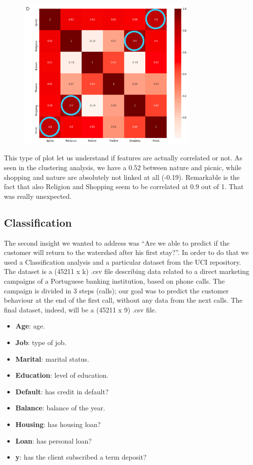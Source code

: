 \begin{figure}[H]
\centering
\includegraphics[width=0.8\textwidth]{Img/correlation_review.png}
\end{figure}

This type of plot let us understand if features are actually correlated or not. As seen in the clustering analysis, we have a 0.52 between nature and picnic, while shopping and nature are absolutely not linked at all (-0.19).
Remarkable is the fact that also Religion and Shopping seem to be correlated at 0.9 out of 1. That was really unexpected.

\newpage
\subsection{Classification}
The second insight we wanted to address was “Are we able to predict if the customer will return to the watershed after his first stay?”.
In order to do that we used a Classification analysis and a particular dataset from the UCI repository. The dataset is a (45211 x k) .csv file describing data related to a direct marketing campaigns of a Portuguese banking institution, based on phone calls. The campaign is divided in 3 steps (calls); our goal was to predict the customer behaviour at the end of the first call, without any data from the next calls. The final dataset, indeed, will be a (45211 x 9) .csv file.


\begin{itemize}
\item \textbf{Age}: age.
\item \textbf{Job}: type of job.
\item \textbf{Marital}: marital status.
\item \textbf{Education}: level of education.
\item \textbf{Default}: has credit in default?
\item \textbf{Balance}: balance of the year.
\item \textbf{Housing}: has housing loan?
\item \textbf{Loan}: has personal loan?
\item \textbf{y}: has the client subscribed a term deposit?
\end{itemize}

